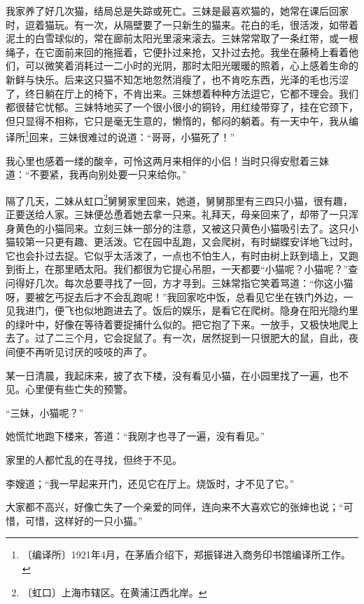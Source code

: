\documentclass[12pt,UTF-8,openany]{ctexbook}
\begin{document}
\begin{normalsize}
    
    我家养了好几次猫，结局总是失踪或死亡。三妹是最喜欢猫的，她常在课后回家时，逗着猫玩。有一次，从隔壁要了一只新生的猫来。花白的毛，很活泼，如带着泥土的白雪球似的，常在廊前太阳光里滚来滚去。三妹常常取了一条红带，或一根绳子，在它面前来回的拖摇着，它便扑过来抢，又扑过去抢。我坐在藤椅上看着他们，可以微笑着消耗过一二小时的光阴，那时太阳光暖暖的照着，心上感着生命的新鲜与快乐。后来这只猫不知怎地忽然消瘦了，也不肯吃东西，光泽的毛也污涩了，终日躺在厅上的椅下，不肯出来。三妹想着种种方法逗它，它都不理会。我们都很替它忧郁。三妹特地买了一个很小很小的铜铃，用红绫带穿了，挂在它颈下，但只显得不相称，它只是毫无生意的，懒惰的，郁闷的躺着。有一天中午，我从编译所\footnote{〔编译所〕1921年4月，在茅盾介绍下，郑振铎进入商务印书馆编译所工作。}回来，三妹很难过的说道：“哥哥，小猫死了！”
    
    我心里也感着一缕的酸辛，可怜这两月来相伴的小侣！当时只得安慰着三妹道：“不要紧，我再向别处要一只来给你。”
    
    隔了几天，二妹从虹口\footnote{〔虹口〕上海市辖区。在黄浦江西北岸。}舅舅家里回来，她道，舅舅那里有三四只小猫，很有趣，正要送给人家。三妹便怂恿着她去拿一只来。礼拜天，母亲回来了，却带了一只浑身黄色的小猫同来。立刻三妹一部分的注意，又被这只黄色小猫吸引去了。这只小猫较第一只更有趣、更活泼。它在园中乱跑，又会爬树，有时蝴蝶安详地飞过时，它也会扑过去捉。它似乎太活泼了，一点也不怕生人，有时由树上跃到墙上，又跑到街上，在那里晒太阳。我们都很为它提心吊胆，一天都要“小猫呢？小猫呢？”查问得好几次。每次总要寻找了一回，方才寻到。三妹常指它笑着骂道：“你这小猫呀，要被乞丐捉去后才不会乱跑呢！”我回家吃中饭，总看见它坐在铁门外边，一见我进门，便飞也似地跑进去了。饭后的娱乐，是看它在爬树。隐身在阳光隐约里的绿叶中，好像在等待着要捉捕什么似的。把它抱了下来。一放手，又极快地爬上去了。过了二三个月，它会捉鼠了。有一次，居然捉到一只很肥大的鼠，自此，夜间便不再听见讨厌的吱吱的声了。
    
    某一日清晨，我起床来，披了衣下楼，没有看见小猫，在小园里找了一遍，也不见。心里便有些亡失的预警。
    
    “三妹，小猫呢？”
    
    她慌忙地跑下楼来，答道：“我刚才也寻了一遍，没有看见。”
    
    家里的人都忙乱的在寻找，但终于不见。
    
    李嫂道；“我一早起来开门，还见它在厅上。烧饭时，才不见了它。”
    
    大家都不高兴，好像亡失了一个亲爱的同伴，连向来不大喜欢它的张婶也说；“可惜，可惜，这样好的一只小猫。”
    

\end{normalsize}
\end{document}
